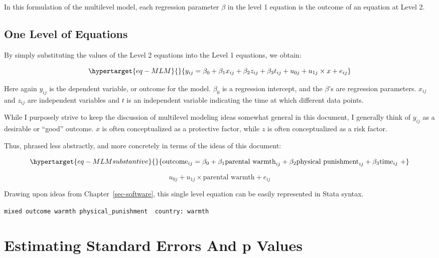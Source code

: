 \documentclass[
  letterpaper,
  DIV=11,
  numbers=noendperiod]{scrreprt}
\begin{document}
In this formulation of the multilevel model, each regression parameter
\(\beta\) in the level 1 equation is the outcome of an equation at Level
2.

\hypertarget{one-level-of-equations}{%
\subsection{One Level of Equations}\label{one-level-of-equations}}

By simply substituting the values of the Level 2 equations into the
Level 1 equations, we obtain:

\begin{equation}\protect\hypertarget{eq-MLM}{}{y_{ij} = \beta_0 + \beta_1 x_{ij} + \beta_2 z_{ij} + \beta_3 t_{ij} + u_{0j} + u_{1j} \times x + e_{ij}}\label{eq-MLM}\end{equation}

Here again \(y_{ij}\) is the dependent variable, or outcome for the
model. \(\beta_0\) is a regression intercept, and the \(\beta\)'s are
regression parameters. \(x_{ij}\) and \(z_{ij}\) are independent
variables and \(t\) is an independent variable indicating the time at
which different data points.

While I purposely strive to keep the discussion of multilevel modeling
ideas somewhat general in this document, I generally think of \(y_{ij}\)
as a desirable or ``good'' outcome. \(x\) is often conceptualized as a
protective factor, while \(z\) is often conceptualized as a risk factor.

Thus, phrased less abstractly, and more concretely in terms of the ideas
of this document:

\begin{equation}\protect\hypertarget{eq-MLMsubstantive}{}{\text{outcome}_{ij} = \beta_0 + \beta_1 \text{parental warmth}_{ij} + \beta_2 \text{physical punishment}_{ij} + \beta_3 \text{time}_{ij} \ + }\label{eq-MLMsubstantive}\end{equation}

\[u_{0j} + u_{1j} \times \text{parental warmth} + e_{ij}\]

Drawing upon ideas from Chapter~\ref{sec-software}, this single level
equation can be easily represented in Stata syntax.

\texttt{mixed\ outcome\ warmth\ physical\_punishment\ \textbar{}\textbar{}\ country:\ warmth}

\hypertarget{sec-pvalues}{%
\section{Estimating Standard Errors And p Values}\label{sec-pvalues}}
\end{document}
